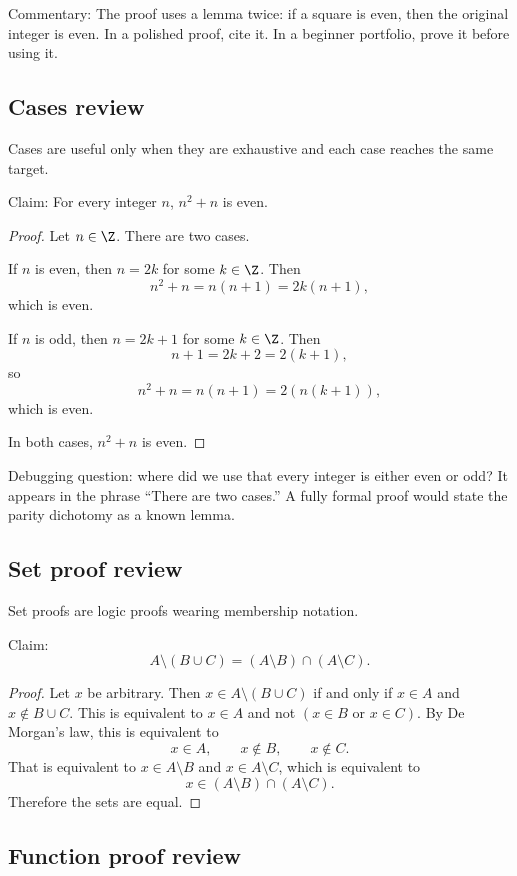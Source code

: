 Commentary: The proof uses a lemma twice: if a square is even, then the original integer is even. In a polished proof, cite it. In a beginner portfolio, prove it before using it.

\subsection{Cases review}

Cases are useful only when they are exhaustive and each case reaches the same target.

Claim: For every integer $n$, $n^2+n$ is even.

\begin{proof}
Let $n\in\Z$. There are two cases.

If $n$ is even, then $n=2k$ for some $k\in\Z$. Then
\[
n^2+n=n(n+1)=2k(n+1),
\]
which is even.

If $n$ is odd, then $n=2k+1$ for some $k\in\Z$. Then
\[
n+1=2k+2=2(k+1),
\]
so
\[
n^2+n=n(n+1)=2(n(k+1)),
\]
which is even.

In both cases, $n^2+n$ is even.
\end{proof}

Debugging question: where did we use that every integer is either even or odd? It appears in the phrase ``There are two cases.'' A fully formal proof would state the parity dichotomy as a known lemma.

\subsection{Set proof review}

Set proofs are logic proofs wearing membership notation.

Claim:
\[
A\setminus(B\cup C)=(A\setminus B)\cap(A\setminus C).
\]

\begin{proof}
Let $x$ be arbitrary. Then $x\in A\setminus(B\cup C)$ if and only if $x\in A$ and $x\notin B\cup C$. This is equivalent to $x\in A$ and not $(x\in B\text{ or }x\in C)$. By De Morgan's law, this is equivalent to
\[
x\in A,\qquad x\notin B,\qquad x\notin C.
\]
That is equivalent to $x\in A\setminus B$ and $x\in A\setminus C$, which is equivalent to
\[
x\in(A\setminus B)\cap(A\setminus C).
\]
Therefore the sets are equal.
\end{proof}

\subsection{Function proof review}

